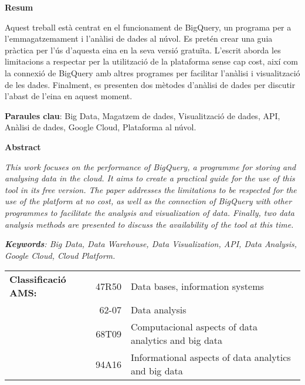 \documentclass[12pt,longbibliography]{article}
\theoremstyle{definition}
\theoremstyle{remark}
\newcommand\blankpage{%
    \null
    \thispagestyle{empty}%
    \addtocounter{page}{-1}%
    \newpage}
\begin{document}
\newpage
\begin{center}
\textbf{Resum}
\end{center}

Aquest treball està centrat en el funcionament de BigQuery, un programa per a l'emmagatzemament i l'anàlisi de dades al núvol. Es pretén crear una guia pràctica per l'ús d'aquesta eina en la seva versió gratuïta. L'escrit aborda les limitacions a respectar per la utilització de la plataforma sense cap cost, així com la connexió de BigQuery amb altres programes per facilitar l'anàlisi i visualització de les dades. Finalment, es presenten dos mètodes d'anàlisi de dades per discutir l'abast de l'eina en aquest moment.

\textbf{Paraules clau}: Big Data, Magatzem de dades, Visualització de dades, API, Anàlisi de dades, Google Cloud, Plataforma al núvol.

\begin{center}
\textbf{Abstract}
\end{center}

\emph{This work focuses on the performance of BigQuery, a programme for storing and analysing data in the cloud. It aims to create a practical guide for the use of this tool in its free version. The paper addresses the limitations to be respected for the use of the platform at no cost, as well as the connection of BigQuery with other programmes to facilitate the analysis and visualization of data. Finally, two data analysis methods are presented to discuss the availability of the tool at this time.}

\emph{\textbf{Keywords}: Big Data, Data Warehouse, Data Visualization, API, Data Analysis, Google Cloud, Cloud Platform.}

\vspace{1cm}

\begin{table}[h!]
\begin{tabular}{lrl}
\textbf{Classificació AMS:} & 47R50 & Data bases, information systems                      \\
                            & 62-07 & Data analysis                                        \\
                            & 68T09 & Computacional aspects of data analytics and big data \\
                            & 94A16 & Informational aspects of data analytics and big data
\end{tabular}
\end{table}

\newpage

\afterpage{\blankpage}
\end{document}
